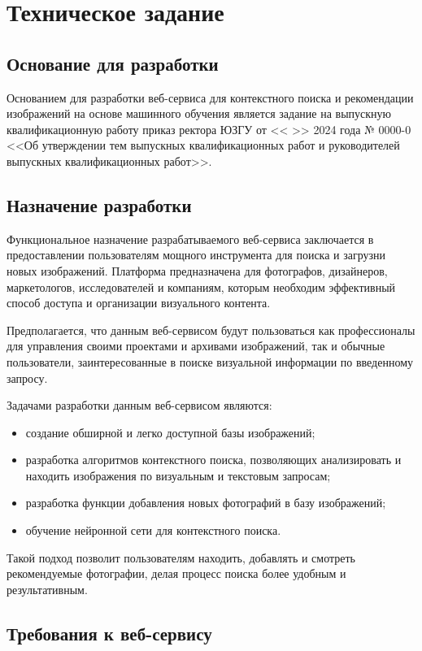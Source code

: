 \newsection
\section{Техническое задание}
\subsection{Основание для разработки}

Основанием для разработки веб-сервиса для контекстного поиска и рекомендации изображений на основе машинного обучения является задание на выпускную квалификационную работу приказ ректора ЮЗГУ от <<  >>     2024 года № 0000-0 <<Об утверждении тем выпускных квалификационных работ и руководителей выпускных квалификационных работ>>.

\subsection{Назначение разработки}

Функциональное назначение разрабатываемого веб-сервиса заключается в предоставлении пользователям мощного инструмента для поиска и загрузни новых изображений. Платформа предназначена для фотографов, дизайнеров, маркетологов, исследователей и компаниям, которым необходим эффективный способ доступа и организации визуального контента.

Предполагается, что данным веб-сервисом будут пользоваться как профессионалы для управления своими проектами и архивами изображений, так и обычные пользователи, заинтересованные в поиске визуальной информации по введенному запросу.

Задачами разработки данным веб-сервисом являются:
\begin{itemize}
	\item создание обширной и легко доступной базы изображений;
	\item разработка алгоритмов контекстного поиска, позволяющих анализировать и находить изображения по визуальным и текстовым запросам;
	\item разработка функции добавления новых фотографий в базу изображений;
	\item обучение нейронной сети для контекстного поиска.
\end{itemize}

Такой подход позволит пользователям находить, добавлять и смотреть рекомендуемые фотографии, делая процесс поиска более удобным и результативным.

\subsection{Требования к веб-сервису}

